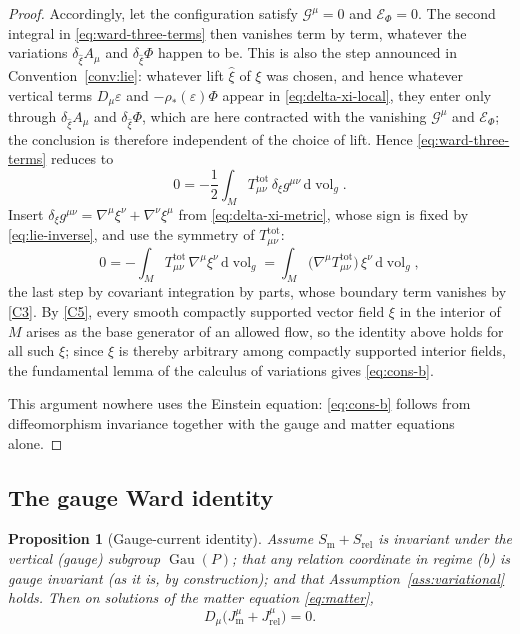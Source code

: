 \documentclass[11pt,a4paper]{article}
\theoremstyle{plain}
\newtheorem{proposition}[theorem]{Proposition}
\theoremstyle{definition}
\theoremstyle{remark}
\newcommand{\Gau}{\operatorname{Gau}}
\newcommand{\dvol}{\mathrm{d}\!\operatorname{vol}_g}
\begin{document}
\begin{proof}
Accordingly, let the configuration satisfy $\mathcal{G}^{\mu}=0$ and $\mathcal{E}_\Phi=0$. The
second integral in \eqref{eq:ward-three-terms} then vanishes term by term, whatever the variations
$\delta_{\hat\xi}A_\mu$ and $\delta_{\hat\xi}\Phi$ happen to be. This is also the step announced in
Convention~\ref{conv:lie}: whatever lift $\hat\xi$ of $\xi$ was chosen, and hence whatever vertical
terms $D_\mu\varepsilon$ and $-\rho_*(\varepsilon)\Phi$ appear in \eqref{eq:delta-xi-local}, they
enter only through $\delta_{\hat\xi}A_\mu$ and $\delta_{\hat\xi}\Phi$, which are here contracted with
the vanishing $\mathcal{G}^{\mu}$ and $\mathcal{E}_\Phi$; the conclusion is therefore independent of
the choice of lift. Hence \eqref{eq:ward-three-terms} reduces to
\[
0=-\frac12\int_M T^{\mathrm{tot}}_{\mu\nu}\,\delta_\xi g^{\mu\nu}\,\dvol .
\]
Insert $\delta_\xi g^{\mu\nu}=\nabla^{\mu}\xi^{\nu}+\nabla^{\nu}\xi^{\mu}$ from
\eqref{eq:delta-xi-metric}, whose sign is fixed by \eqref{eq:lie-inverse}, and use the symmetry of
$T^{\mathrm{tot}}_{\mu\nu}$:
\[
0=-\int_M T^{\mathrm{tot}}_{\mu\nu}\,\nabla^{\mu}\xi^{\nu}\,\dvol
=\int_M \bigl(\nabla^{\mu}T^{\mathrm{tot}}_{\mu\nu}\bigr)\,\xi^{\nu}\,\dvol ,
\]
the last step by covariant integration by parts, whose boundary term vanishes by \ref{C3}. By
\ref{C5}, every smooth compactly supported vector field $\xi$ in the interior of $M$ arises as the
base generator of an allowed flow, so the identity above holds for all such $\xi$; since $\xi$ is
thereby arbitrary among compactly supported interior fields, the fundamental lemma of the calculus
of variations gives \eqref{eq:cons-b}.

This argument nowhere uses the Einstein equation: \eqref{eq:cons-b} follows from diffeomorphism
invariance \cite{Noether1918} together with the gauge and matter equations alone.
\end{proof}

\subsection{The gauge Ward identity}

\begin{proposition}[Gauge-current identity]
\label{prop:gauge-current}
Assume $S_{\mathrm{m}}+S_{\mathrm{rel}}$ is invariant under the vertical (gauge) subgroup
$\Gau(P)$; that any relation coordinate in regime (b) is gauge invariant (as it is, by
construction); and that Assumption~\ref{ass:variational} holds. Then on solutions of the matter
equation \eqref{eq:matter},
\begin{equation}
\label{eq:current-cons}
D_\mu\bigl(J^{\mu}_{\mathrm{m}}+J^{\mu}_{\mathrm{rel}}\bigr)=0 .
\end{equation}
\end{proposition}
\end{document}
